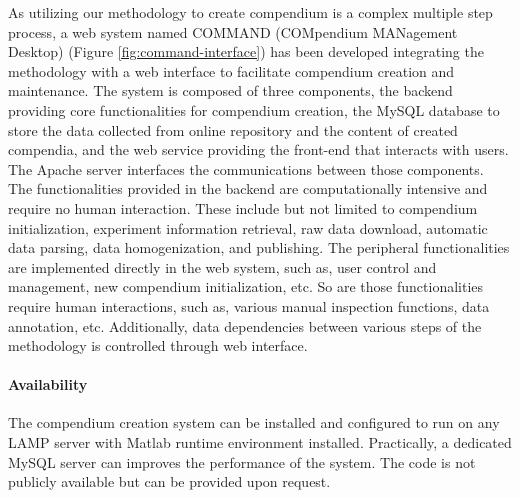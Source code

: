 As utilizing our methodology to create compendium is a complex multiple step
process, a web system named COMMAND (COMpendium MANagement Desktop) (Figure 
\ref{fig:command-interface}) has been developed integrating the methodology 
with a web interface to facilitate compendium creation and maintenance.
%
The system is composed of three components, the backend providing core
functionalities for compendium creation, the MySQL database to store the data
collected from online repository and the content of created compendia, and the
web service providing the front-end that interacts with users.  The Apache
server interfaces the communications between those components.
%
The functionalities provided in the backend are computationally intensive and
require no human interaction.  These include but not limited to compendium
initialization, experiment information retrieval, raw data download, automatic
data parsing, data homogenization, and publishing.
%
The peripheral functionalities are implemented directly in the web system,
such as, user control and management, new compendium initialization, etc.  So
are those functionalities require human interactions, such as, various manual
inspection functions, data annotation, etc.  Additionally, data dependencies
between various steps of the methodology is controlled through web interface.


\paragraph{Availability} 
The compendium creation system can be installed and configured to run on any
LAMP server with Matlab runtime environment installed.  Practically, a
dedicated MySQL server can improves the performance of the system.
The code is not publicly available but can be provided upon request.



%
%
%
%


